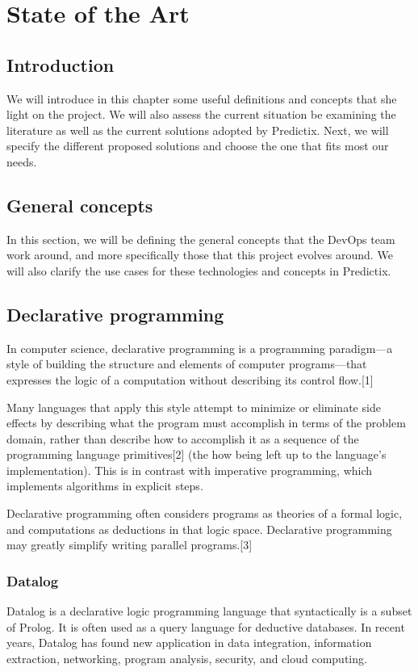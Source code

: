\chapter{State of the Art}


\section*{Introduction}
We will introduce in this chapter some useful definitions and concepts that she
light on  the project. We will also assess the current situation be examining
the literature as well as the current solutions adopted by Predictix. Next, we
will specify the different proposed solutions and choose the one that fits most
our needs.
\pagebreak

\section{General concepts}

In this section, we will be defining the general concepts that the DevOps team
work around, and more specifically those that this project evolves around. We
will also clarify the use cases for these technologies and concepts in
Predictix.

\section{Declarative programming}
In computer science, declarative programming is a programming paradigm—a style
of building the structure and elements of computer programs—that expresses the
logic of a computation without describing its control flow.[1]

Many languages that apply this style attempt to minimize or eliminate side
effects by describing what the program must accomplish in terms of the problem
domain, rather than describe how to accomplish it as a sequence of the
programming language primitives[2] (the how being left up to the language's
implementation). This is in contrast with imperative programming, which
implements algorithms in explicit steps.

Declarative programming often considers programs as theories of a formal logic,
and computations as deductions in that logic space. Declarative programming may
greatly simplify writing parallel programs.[3]

\subsection{Datalog}
Datalog is a declarative logic programming language that syntactically is a
subset of Prolog. It is often used as a query language for deductive databases.
In recent years, Datalog has found new application in data integration,
information extraction, networking, program analysis, security, and cloud
computing.

